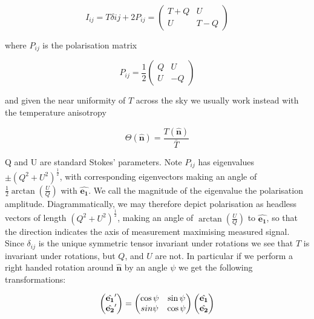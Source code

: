 \documentclass[a4paper,10pt]{article}
\renewcommand{\v}[1]{\mathbf{#1}}
\newcommand{\half}{\frac{1}{2}}
\newcommand{\unit}[1]{\hat{\v{#1}}}
\begin{document}
\begin{equation}
I_{ij} = T\delta{ij}+2P_{ij}
=\begin{pmatrix}
T+Q & U\\ 
U & T-Q
\end{pmatrix}
\end{equation}

where $P_{ij}$ is the polarisation matrix

\begin{equation}
P_{ij} =\half \begin{pmatrix}
Q & U\\ 
U & -Q
\end{pmatrix}
\end{equation}

and given the near uniformity of $T$ across the sky we usually work instead with the temperature anisotropy

\begin{equation}
\Theta(\unit{n}) = \frac{T(\unit{n})}{\bar{T}}
\end{equation}

Q and U are standard Stokes' parameters. Note $P_{ij}$ has eigenvalues $\pm (Q^2 + U^2)^\half$, with corresponding eigenvectors making an angle of $\half\arctan(\frac{U}{Q})$ with $\unit{e_1}$. We call the magnitude of the eigenvalue the polarisation amplitude. Diagrammatically, we may therefore depict polarisation as headless vectors of length $(Q^2 + U^2)^\half$, making an angle of $\arctan(\frac{U}{Q})$ to $\unit{e_1}$, so that the direction indicates the axis of measurement maximising measured signal.\\


Since $\delta_{ij}$ is the unique symmetric tensor invariant under rotations we see that $T$ is invariant under rotations, but $Q$, and $U$ are not. In particular if we perform a right handed rotation around $\unit{n}$ by an angle $\psi$ we get the following transformations:


\begin{equation}
\begin{pmatrix}
\unit{e_1}'\\
\unit{e_2}' 
\end{pmatrix}
=
\begin{pmatrix}
\cos{\psi} & \sin{\psi}\\ 
\-sin{\psi} & \cos{\psi}
\end{pmatrix}
\begin{pmatrix}
\unit{e_1}\\
\unit{e_2} 
\end{pmatrix}
\end{equation}
\end{document}
